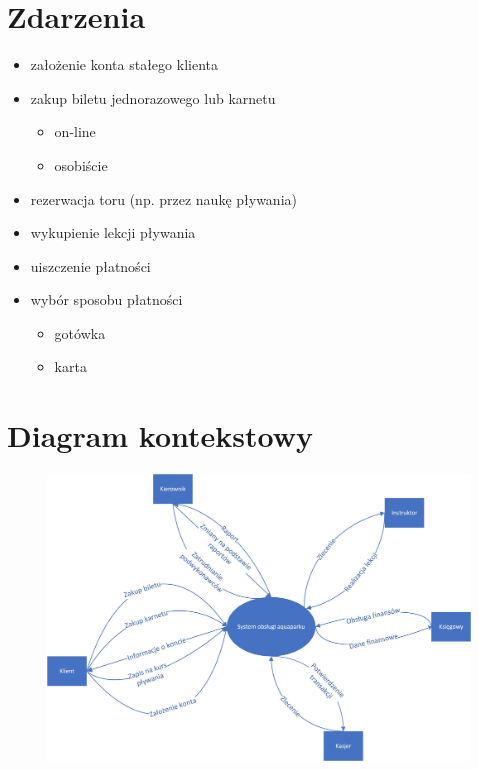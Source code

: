 \documentclass[a4paper,11pt]{article}
\begin{document}
\section{Zdarzenia}
\begin{itemize}
    \item założenie konta stałego klienta
    \item zakup biletu jednorazowego lub karnetu
            \begin{itemize}
                \item on-line
                \item osobiście
            \end{itemize}
    \item rezerwacja toru (np. przez naukę pływania)
    \item wykupienie lekcji pływania
    \item uiszczenie płatności
    \item wybór sposobu płatności
            \begin{itemize}
                \item gotówka
                \item karta
            \end{itemize}
\end{itemize}
\newpage


\section{Diagram kontekstowy}
    \begin{figure}[!htb]
    \centerline{\includegraphics[scale=0.7]{kontekstowy.jpg}}
    \label{fig:kontekstowy}
    \end{figure}
\newpage
\end{document}

